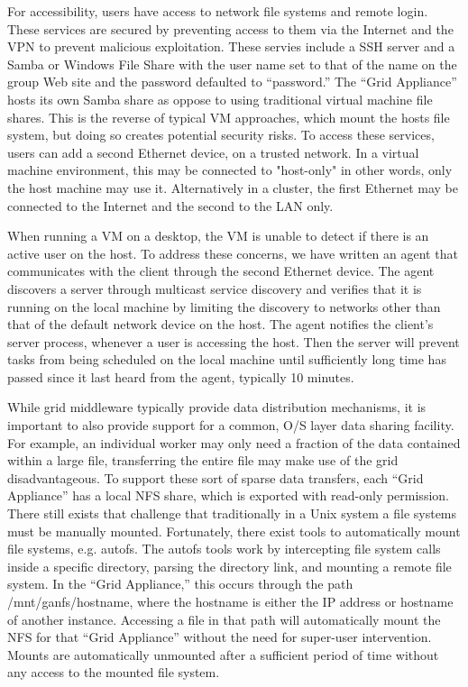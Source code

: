 \documentclass[conference]{IEEEtran}
\begin{document}
For accessibility, users have access to network file systems and remote login.
These services are secured by preventing access to them via the Internet and
the VPN to prevent malicious exploitation.  These servies include a SSH server
and a Samba or Windows File Share with the user name set to that of the name on
the group Web site and the password defaulted to ``password.'' The ``Grid
Appliance'' hosts its own Samba share as oppose to using traditional virtual
machine file shares.  This is the reverse of typical VM approaches, which mount
the hosts file system, but doing so creates potential security risks.  To
access these services, users can add a second Ethernet device, on a trusted
network.  In a virtual machine environment, this may be connected to
"host-only" in other words, only the host machine may use it.  Alternatively in
a cluster, the first Ethernet may be connected to the Internet and the second
to the LAN only.

When running a VM on a desktop, the VM is unable to detect if there is an
active user on the host.  To address these concerns, we have written an agent
that communicates with the client through the second Ethernet device.  The
agent discovers a server through multicast service discovery and verifies that
it is running on the local machine by limiting the discovery to networks other
than that of the default network device on the host.  The agent notifies the
client's server process, whenever a user is accessing the host.  Then the
server will prevent tasks from being scheduled on the local machine until
sufficiently long time has passed since it last heard from the agent, typically
10 minutes.

While grid middleware typically provide data distribution mechanisms, it is important
to also provide support for a common, O/S layer data sharing facility.  For example, an individual worker may only
need a fraction of the data contained within a large file, transferring the
entire file may make use of the grid disadvantageous.  To support these sort of
sparse data transfers, each ``Grid Appliance'' has a local NFS share, which is
exported with read-only permission.  There still exists that challenge that
traditionally in a Unix system a file systems must be manually mounted.
Fortunately, there exist tools to automatically mount file systems, e.g.
autofs. The autofs tools work by intercepting file system calls inside a specific
directory, parsing the directory link, and mounting a remote file system.  In
the ``Grid Appliance,'' this occurs through the path /mnt/ganfs/hostname, where
the hostname is either the IP address or hostname of another instance.
Accessing a file in that path will automatically mount the NFS for that ``Grid
Appliance'' without the need for super-user intervention.  Mounts are
automatically unmounted after a sufficient period of time without any access to
the mounted file system.  
\end{document}
